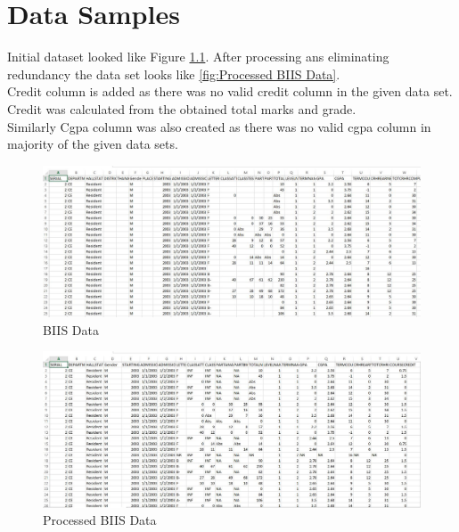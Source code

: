 
\chapter{Data Samples} %

\label{Appendix A} %
Initial dataset looked like Figure \ref{fig:Initial BIIS  Data}. After processing ans eliminating redundancy the data set looks like \ref{fig:Processed BIIS Data}.\\
Credit column is added as there was no valid credit column in the given data set. Credit was calculated from the obtained total marks and grade.\\Similarly Cgpa column was also created as there was no valid cgpa column in majority of the given data sets.

\begin{figure}[H]
   \centering
  \includegraphics[width=\linewidth]{Figures/data.jpg}
  \decoRule
  \caption[BIIS Data]{BIIS Data}
  \label{fig:Initial BIIS  Data}
\end{figure}

\begin{figure}[H]
   \centering
  \includegraphics[width=\linewidth]{Figures/data1.jpg}
  \decoRule
  \caption[Processed BIIS Data]{Processed BIIS Data}
  \label{fig:Processed BIIS  Data}
\end{figure}